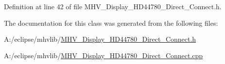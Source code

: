 \-Definition at line 42 of file \-M\-H\-V\-\_\-\-Display\-\_\-\-H\-D44780\-\_\-\-Direct\-\_\-\-Connect.\-h.



\-The documentation for this class was generated from the following files\-:\begin{DoxyCompactItemize}
\item 
\-A\-:/eclipse/mhvlib/\hyperlink{_m_h_v___display___h_d44780___direct___connect_8h}{\-M\-H\-V\-\_\-\-Display\-\_\-\-H\-D44780\-\_\-\-Direct\-\_\-\-Connect.\-h}\item 
\-A\-:/eclipse/mhvlib/\hyperlink{_m_h_v___display___h_d44780___direct___connect_8cpp}{\-M\-H\-V\-\_\-\-Display\-\_\-\-H\-D44780\-\_\-\-Direct\-\_\-\-Connect.\-cpp}\end{DoxyCompactItemize}

